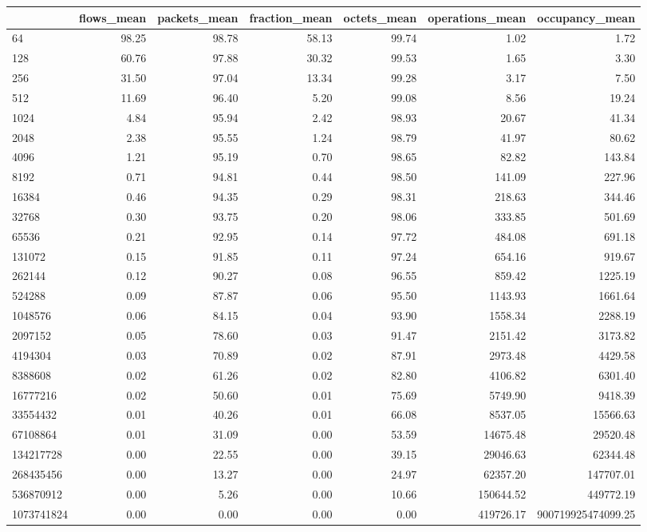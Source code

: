 \begin{tabular}{lrrrrrr}
\toprule
 & flows_mean & packets_mean & fraction_mean & octets_mean & operations_mean & occupancy_mean \\
\midrule
64 & 98.25 & 98.78 & 58.13 & 99.74 & 1.02 & 1.72 \\
128 & 60.76 & 97.88 & 30.32 & 99.53 & 1.65 & 3.30 \\
256 & 31.50 & 97.04 & 13.34 & 99.28 & 3.17 & 7.50 \\
512 & 11.69 & 96.40 & 5.20 & 99.08 & 8.56 & 19.24 \\
1024 & 4.84 & 95.94 & 2.42 & 98.93 & 20.67 & 41.34 \\
2048 & 2.38 & 95.55 & 1.24 & 98.79 & 41.97 & 80.62 \\
4096 & 1.21 & 95.19 & 0.70 & 98.65 & 82.82 & 143.84 \\
8192 & 0.71 & 94.81 & 0.44 & 98.50 & 141.09 & 227.96 \\
16384 & 0.46 & 94.35 & 0.29 & 98.31 & 218.63 & 344.46 \\
32768 & 0.30 & 93.75 & 0.20 & 98.06 & 333.85 & 501.69 \\
65536 & 0.21 & 92.95 & 0.14 & 97.72 & 484.08 & 691.18 \\
131072 & 0.15 & 91.85 & 0.11 & 97.24 & 654.16 & 919.67 \\
262144 & 0.12 & 90.27 & 0.08 & 96.55 & 859.42 & 1225.19 \\
524288 & 0.09 & 87.87 & 0.06 & 95.50 & 1143.93 & 1661.64 \\
1048576 & 0.06 & 84.15 & 0.04 & 93.90 & 1558.34 & 2288.19 \\
2097152 & 0.05 & 78.60 & 0.03 & 91.47 & 2151.42 & 3173.82 \\
4194304 & 0.03 & 70.89 & 0.02 & 87.91 & 2973.48 & 4429.58 \\
8388608 & 0.02 & 61.26 & 0.02 & 82.80 & 4106.82 & 6301.40 \\
16777216 & 0.02 & 50.60 & 0.01 & 75.69 & 5749.90 & 9418.39 \\
33554432 & 0.01 & 40.26 & 0.01 & 66.08 & 8537.05 & 15566.63 \\
67108864 & 0.01 & 31.09 & 0.00 & 53.59 & 14675.48 & 29520.48 \\
134217728 & 0.00 & 22.55 & 0.00 & 39.15 & 29046.63 & 62344.48 \\
268435456 & 0.00 & 13.27 & 0.00 & 24.97 & 62357.20 & 147707.01 \\
536870912 & 0.00 & 5.26 & 0.00 & 10.66 & 150644.52 & 449772.19 \\
1073741824 & 0.00 & 0.00 & 0.00 & 0.00 & 419726.17 & 900719925474099.25 \\
\bottomrule
\end{tabular}
